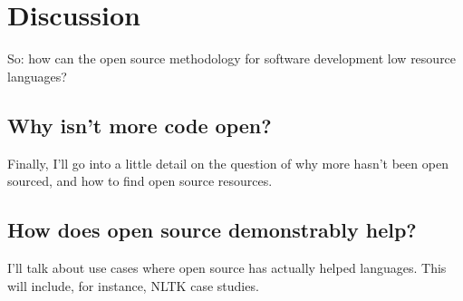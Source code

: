 \section{Discussion}
\label{sec:discussion}

So: how can the open source methodology for software development low resource languages?

\subsection{Why isn't more code open?}

Finally, I'll go into a little detail on the question of why more hasn't been open sourced, and how to find open source resources.

\subsection{How does open source demonstrably help?}

I'll talk about use cases where open source has actually helped languages. This will include, for instance, NLTK case studies.